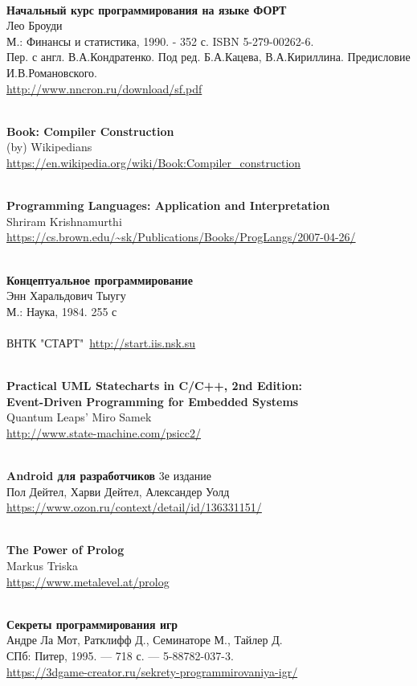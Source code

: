 \begin{thebibliography}{99}
\clearpage
{}\ \\
\textbf{Начальный курс программирования на языке ФОРТ}\\
Лео Броуди \\
М.: Финансы и статистика, 1990. - 352 с.  ISBN 5-279-00262-6.\\
Пер. с англ. В.А.Кондратенко. Под ред. Б.А.Кацева, В.А.Кириллина. Предисловие
И.В.Романовского.\\
\url{http://www.nncron.ru/download/sf.pdf}

\clearpage
{}\ \\
\textbf{Book: Compiler Construction}\\
(by) Wikipedians\\
\url{https://en.wikipedia.org/wiki/Book:Compiler_construction}

\clearpage
{}\ \\
\textbf{Programming Languages: Application and Interpretation}\\
Shriram Krishnamurthi\\
\url{https://cs.brown.edu/~sk/Publications/Books/ProgLangs/2007-04-26/}

\clearpage
{}\ \\
\textbf{Концептуальное программирование}\\
Энн Харальдович Тыугу\\
М.: Наука, 1984. 255 с\\
\ \\
ВНТК "СТАРТ"\ \url{http://start.iis.nsk.su}

\clearpage
{}\ \\
\textbf{Practical UML Statecharts in C/C++, 2nd Edition:\\
Event-Driven Programming for Embedded Systems}\\
Quantum Leaps' Miro Samek\\
\url{http://www.state-machine.com/psicc2/}

\clearpage
{}\ \\
\textbf{Android для разработчиков} 3е издание\\
Пол Дейтел, Харви Дейтел, Александер Уолд\\
\url{https://www.ozon.ru/context/detail/id/136331151/}

\clearpage
{}\ \\
\textbf{The Power of Prolog}\\
Markus Triska\\
\url{https://www.metalevel.at/prolog}

\clearpage
{}\ \\
\textbf{Секреты программирования игр}\\
Андре Ла Мот, Ратклифф Д., Семинаторе М., Тайлер Д.\\
СПб: Питер, 1995. — 718 с. — 5-88782-037-3.\\
\url{https://3dgame-creator.ru/sekrety-programmirovaniya-igr/}

\end{thebibliography}
